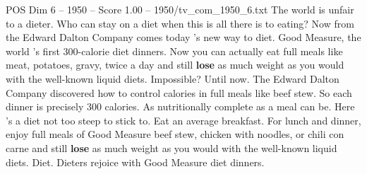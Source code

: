 \begin{textsample}{POS Dim 6 – 1950 – Score 1.00 – 1950/tv\_com\_1950\_6.txt}  \label{ex:f6_pos_017}
The world is unfair to a dieter.
Who can stay on a diet when this is all there is to eating?
Now from the Edward Dalton Company comes today 's new way to diet.
Good Measure, the world 's first 300-calorie diet dinners.
Now you can actually eat full meals like meat, potatoes, gravy, twice a day and still \textbf{lose} as much weight as you would with the well-known liquid diets.
Impossible?
Until now.
The Edward Dalton Company discovered how to control calories in full meals like beef stew.
So each dinner is precisely 300 calories.
As nutritionally complete as a meal can be.
Here 's a diet not too steep to stick to.
Eat an average breakfast.
For lunch and dinner, enjoy full meals of Good Measure beef stew, chicken with noodles, or chili con carne and still \textbf{lose} as much weight as you would with the well-known liquid diets.
Diet.
Dieters rejoice with Good Measure diet dinners.

\end{textsample}
